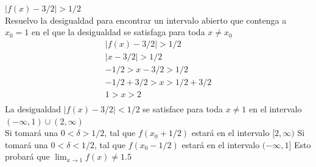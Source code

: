 \documentclass[12pt, letterpaper]{article}
\begin{document}
$| f(x) - 3/2 | > 1/2$\\
Resuelvo la desigualdad para encontrar un intervalo abierto que contenga a $x_0 = 1$ en el que la desigualdad se satisfaga para toda $x \neq x_0$
\begin{align*}
	| f(x) - 3/2 | > 1/2 \\
	| x - 3/2 | > 1/2\\
	- 1/2 >  x - 3/2 > 1/2\\
	- 1/2 + 3/2  >  x  > 1/2 + 3/2\\
	 1  >  x  > 2\\
\end{align*}
La desigualdad 	$| f(x) - 3/2 | <1/2$ se satisface para toda $x\neq 1$ en el intervalo $(-\infty, 1) \cup (2, \infty)$\\

Si tomará una $0< \delta > 1/2$, tal que $f(x_0+1/2)$ estará en el intervalo $[2, \infty)$
Si tomará una $0 < \delta < 1/2$, tal que $f(x_0 - 1/2)$ estará en el intervalo $(-\infty, 1]$
Esto probará que $\lim_{x \to 1} f(x) \neq 1.5$
\end{document}
